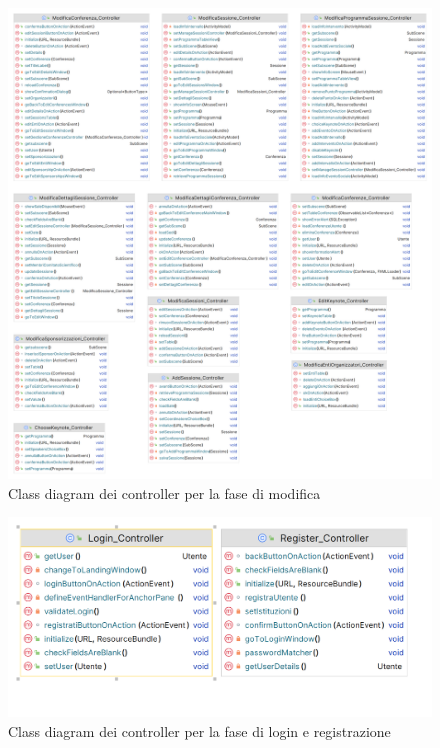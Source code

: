 \begin{figure}[h!]
	\includegraphics[scale=0.17]{Immagini/Controller_Modifica.png}
	\caption{Class diagram dei controller per la fase di modifica}
\end{figure}
\newpage
\begin{figure}[h!]
	\includegraphics[scale=0.25]{Immagini/Controller_Login.png}
	\caption{Class diagram dei controller per la fase di login e registrazione}
\end{figure}

